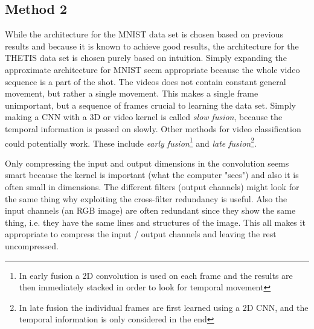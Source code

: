 \subsection{Method 2}
While the architecture for the MNIST data set is chosen based on previous results and because it is known to achieve good results, the architecture for the THETIS data set is chosen purely based on intuition. Simply expanding the approximate architecture for MNIST seem appropriate because the whole video sequence is a part of the shot. The videos does not contain constant general movement, but rather a single movement. This makes a single frame unimportant, but a sequence of frames crucial to learning the data set. Simply making a CNN with a 3D or video kernel is called \textit{slow fusion}, because the temporal information is passed on slowly. Other methods for video classification could potentially work. These include \textit{early fusion}\footnote{In early fusion a 2D convolution is used on each frame and the results are then immediately stacked in order to look for temporal movement} and \textit{late fusion}\footnote{In late fusion the individual frames are first learned using a 2D CNN, and the temporal information is only considered in the end}\cite{Karpathy2014}.

Only compressing the input and output dimensions in the convolution seems smart because the kernel is important (what the computer "sees") and also it is often small in dimensions. The different filters (output channels) might look for the same thing why exploiting the cross-filter redundancy is useful. Also the input channels (an RGB image) are often redundant since they show the same thing, i.e. they have the same lines and structures of the image. This all makes it appropriate to compress the input / output channels and leaving the rest uncompressed.

